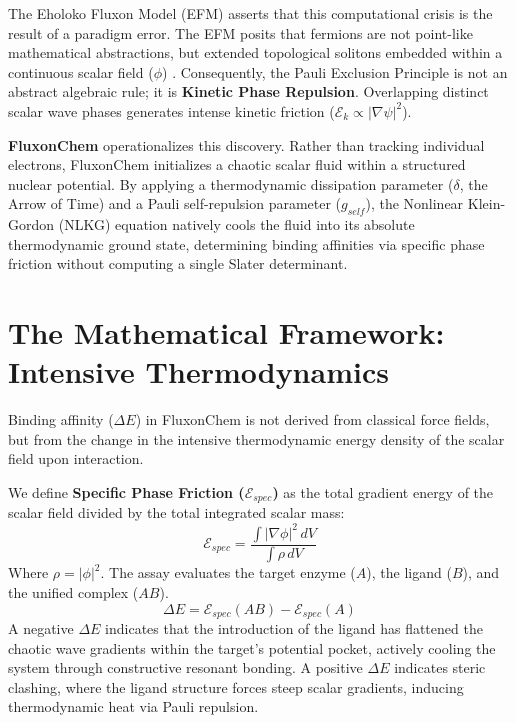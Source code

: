 \documentclass[11pt, twoside]{article}
\begin{document}
The Eholoko Fluxon Model (EFM) asserts that this computational crisis is the result of a paradigm error. The EFM posits that fermions are not point-like mathematical abstractions, but extended topological solitons embedded within a continuous scalar field ($\phi$) \citep{emvula2026charge}. Consequently, the Pauli Exclusion Principle is not an abstract algebraic rule; it is \textbf{Kinetic Phase Repulsion}. Overlapping distinct scalar wave phases generates intense kinetic friction ($\mathcal{E}_k \propto |\nabla \psi|^2$). 

\textbf{FluxonChem} operationalizes this discovery. Rather than tracking individual electrons, FluxonChem initializes a chaotic scalar fluid within a structured nuclear potential. By applying a thermodynamic dissipation parameter ($\delta$, the Arrow of Time) and a Pauli self-repulsion parameter ($g_{self}$), the Nonlinear Klein-Gordon (NLKG) equation natively cools the fluid into its absolute thermodynamic ground state, determining binding affinities via specific phase friction without computing a single Slater determinant.

\section{The Mathematical Framework: Intensive Thermodynamics}

Binding affinity ($\Delta E$) in FluxonChem is not derived from classical force fields, but from the change in the intensive thermodynamic energy density of the scalar field upon interaction.

We define \textbf{Specific Phase Friction ($\mathcal{E}_{spec}$)} as the total gradient energy of the scalar field divided by the total integrated scalar mass:
\begin{equation}
    \mathcal{E}_{spec} = \frac{\int |\nabla \phi|^2 \, dV}{\int \rho \, dV}
\end{equation}
Where $\rho = |\phi|^2$. The assay evaluates the target enzyme ($A$), the ligand ($B$), and the unified complex ($AB$).
\begin{equation}
    \Delta E = \mathcal{E}_{spec}(AB) - \mathcal{E}_{spec}(A)
\end{equation}
A negative $\Delta E$ indicates that the introduction of the ligand has flattened the chaotic wave gradients within the target's potential pocket, actively cooling the system through constructive resonant bonding. A positive $\Delta E$ indicates steric clashing, where the ligand structure forces steep scalar gradients, inducing thermodynamic heat via Pauli repulsion.
\end{document}

